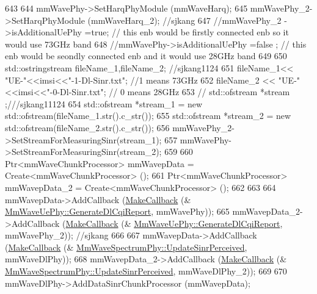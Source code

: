 \begin{DoxyCode}
643 
644         mmWavePhy->SetHarqPhyModule (mmWaveHarq);
645         mmWavePhy\_2->SetHarqPhyModule (mmWaveHarq\_2); \textcolor{comment}{//sjkang}
647 \textcolor{comment}{}        \textcolor{comment}{//mmWavePhy\_2 ->isAdditionalUePhy =true; // this enb would be firstly connected enb so it would use
       73GHz band}
648         \textcolor{comment}{//mmWavePhy->isAdditionalUePhy =false ; // this enb would be seondly connected enb and it would use
       28GHz band}
649 
650         std::ostringstream fileName\_1,fileName\_2; \textcolor{comment}{//sjkang1124}
651         fileName\_1<< \textcolor{stringliteral}{"UE-"}<<imsi<<\textcolor{stringliteral}{"-1-Dl-Sinr.txt"}; \textcolor{comment}{//1 means 73GHz}
652         fileName\_2 << \textcolor{stringliteral}{"UE-"}<<imsi<<\textcolor{stringliteral}{"-0-Dl-Sinr.txt"};  \textcolor{comment}{// 0 means 28GHz}
653 \textcolor{comment}{//      std::ofstream *stream ;///sjkang11124}
654         std::ofstream *stream\_1 = \textcolor{keyword}{new} std::ofstream(fileName\_1.str().c\_str());
655         std::ofstream *stream\_2 = \textcolor{keyword}{new} std::ofstream(fileName\_2.str().c\_str());
656     mmWavePhy\_2->SetStreamForMeasuringSinr(stream\_1);
657     mmWavePhy->SetStreamForMeasuringSinr(stream\_2);
659 
660         Ptr<mmWaveChunkProcessor> mmWavepData = Create<mmWaveChunkProcessor> ();
661         Ptr<mmWaveChunkProcessor> mmWavepData\_2 = Create<mmWaveChunkProcessor> ();
662 
663 
664         mmWavepData->AddCallback (\hyperlink{group__makecallbackmemptr_ga9376283685aa99d204048d6a4b7610a4}{MakeCallback} (&
      \hyperlink{classns3_1_1MmWaveUePhy_a94ad8ac60220078f5b5928018fb0e933}{MmWaveUePhy::GenerateDlCqiReport}, mmWavePhy));
665         mmWavepData\_2->AddCallback (\hyperlink{group__makecallbackmemptr_ga9376283685aa99d204048d6a4b7610a4}{MakeCallback} (&
      \hyperlink{classns3_1_1MmWaveUePhy_a94ad8ac60220078f5b5928018fb0e933}{MmWaveUePhy::GenerateDlCqiReport}, mmWavePhy\_2)); \textcolor{comment}{//sjkang}
666 
667         mmWavepData->AddCallback (\hyperlink{group__makecallbackmemptr_ga9376283685aa99d204048d6a4b7610a4}{MakeCallback} (&
      \hyperlink{classns3_1_1MmWaveSpectrumPhy_ad00477c4185055c7fb2b717bb42fd668}{MmWaveSpectrumPhy::UpdateSinrPerceived}, mmWaveDlPhy));
668         mmWavepData\_2->AddCallback (\hyperlink{group__makecallbackmemptr_ga9376283685aa99d204048d6a4b7610a4}{MakeCallback} (&
      \hyperlink{classns3_1_1MmWaveSpectrumPhy_ad00477c4185055c7fb2b717bb42fd668}{MmWaveSpectrumPhy::UpdateSinrPerceived}, mmWaveDlPhy\_2));
669 
670         mmWaveDlPhy->AddDataSinrChunkProcessor (mmWavepData);

\end{DoxyCode}
